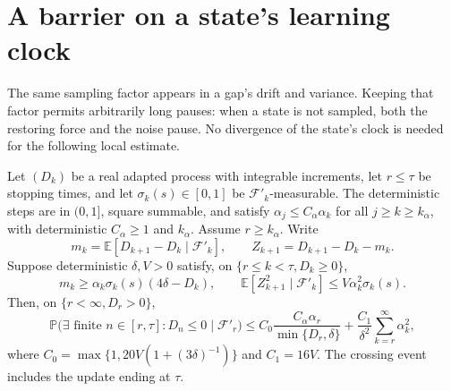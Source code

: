 \section{A barrier on a state's learning clock}
The same sampling factor appears in a gap's drift and variance. Keeping that factor permits
arbitrarily long pauses: when a state is not sampled, both the restoring force and the noise
pause. No divergence of the state's clock is needed for the following local estimate.

\begin{lemma}\label{lem:barrier}
Let $(D_k)$ be a real adapted process with integrable increments, let $r\le\tau$ be stopping times, and let $\sigma_k(s)\in[0,1]$ be $\mathcal F'_k$-measurable. The deterministic steps are in $(0,1]$, square summable, and satisfy $\alpha_j\le C_\alpha\alpha_k$ for all $j\ge k\ge k_\alpha$, with deterministic $C_\alpha\ge1$ and $k_\alpha$. Assume $r\ge k_\alpha$. Write
\[
m_k=\mathbb E[D_{k+1}-D_k\mid\mathcal F'_k],\qquad
Z_{k+1}=D_{k+1}-D_k-m_k.
\]
Suppose deterministic $\delta,V>0$ satisfy, on $\{r\le k<\tau,D_k\ge0\}$,
\begin{equation}\label{eq:barrierhyp}
m_k\ge\alpha_k\sigma_k(s)(4\delta-D_k),\qquad
\mathbb E[Z_{k+1}^2\mid\mathcal F'_k]\le V\alpha_k^2\sigma_k(s).
\end{equation}
Then, on $\{r<\infty,D_r>0\}$,
\begin{equation}\label{eq:barrier}
\mathbb P\bigl(\exists\text{ finite }n\in[r,\tau]:D_n\le0\mid\mathcal F'_r\bigr)
\le C_0\frac{C_\alpha\alpha_r}{\min\{D_r,\delta\}}+\frac{C_1}{\delta^2}\sum_{k=r}^{\infty}\alpha_k^2,
\end{equation}
where $C_0=\max\{1,20V(1+(3\delta)^{-1})\}$ and $C_1=16V$. The crossing event includes the update
ending at $\tau$.
\end{lemma}
